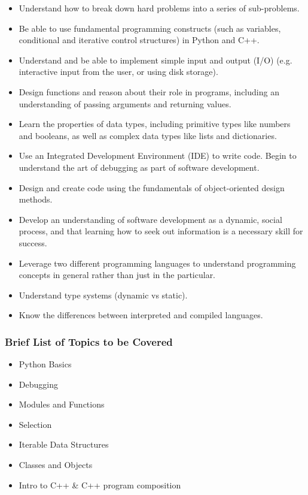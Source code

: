 {\begin{highlight}[\CSPBIntro]
        \begin{itemize}
            \item Understand how to break down hard problems into a series of sub-problems.
            \item Be able to use fundamental programming constructs (such as variables, conditional and iterative control structures) in Python and C++.
            \item Understand and be able to implement simple input and output (I/O) (e.g. interactive input from the user, or using disk storage).
            \item Design functions and reason about their role in programs, including an understanding of passing arguments and returning values.
            \item Learn the properties of data types, including primitive types like numbers and booleans, as well as complex data types like lists and dictionaries.
            \item Use an Integrated Development Environment (IDE) to write code.  Begin to understand the art of debugging as part of software development.
            \item Design and create code using the fundamentals of object-oriented design methods.
            \item Develop an understanding of software development as a dynamic, social process, and that learning how to seek out information is a necessary skill for success.
            \item Leverage two different programming languages to understand programming concepts in general rather than just in the particular.
            \item Understand type systems (dynamic vs static).
            \item Know the differences between interpreted and compiled languages.
        \end{itemize}
        
        \subsubsection*{Brief List of Topics to be Covered}
    
        \begin{itemize}
            \item Python Basics
            \item Debugging
            \item Modules and Functions
            \item Selection
            \item Iterable Data Structures
            \item Classes and Objects
            \item Intro to C++ \& C++ program composition
        \end{itemize}
        

\end{highlight}}
